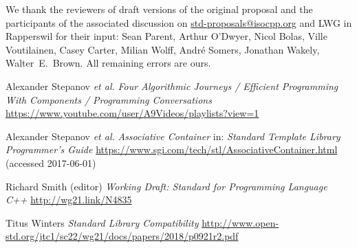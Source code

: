 \documentclass[11pt]{article}
\begin{document}
We thank the reviewers of draft versions of the original proposal and
the participants of the associated discussion on
\url{std-proposals@isocpp.org} and LWG in Rapperswil for their input:
Sean Parent, Arthur O'Dwyer, Nicol Bolas, Ville Voutilainen, Casey
Carter, Milian Wolff, Andr\'e Somers, Jonathan Wakely,
Walter~E.~Brown. All remaining errors are ours.

\begin{thebibliography}{9}
  Alexander Stepanov \emph{et al.}\newline
  \emph{Four Algorithmic Journeys / Efficient Programming With Components /
    Programming Conversations}\newline
  \url{https://www.youtube.com/user/A9Videos/playlists?view=1}

  Alexander Stepanov \emph{et al.}\newline
  \emph{Associative Container}\newline
  in: \emph{Standard Template Library Programmer's Guide}\newline
  \url{https://www.sgi.com/tech/stl/AssociativeContainer.html} (accessed 2017-06-01)

  Richard Smith (editor)\newline
  \emph{Working Draft: Standard for Programming Language C++}\newline
  \url{http://wg21.link/N4835}

 Titus Winters\newline
  \emph{Standard Library Compatibility}\newline
  \url{http://www.open-std.org/jtc1/sc22/wg21/docs/papers/2018/p0921r2.pdf}
\end{thebibliography}
\end{document}
